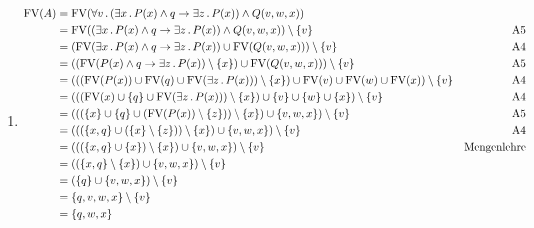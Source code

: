 


\newcommand{\FV}{\text{FV}}
\newcommand{\BV}{\text{BV}}


\date{Donnerstag 5.12.2019}

\newcommand\X{\mathcal{X}}



\maketitle
\thispagestyle{fancy}


\begin{enumerate}[1)]
	\item \begin{align*}
		\FV(A) & = \FV (\fall{v} (\ex{x} P(x) \land q \to \ex{z} P(x)) \land Q(v, w, x)) \\
		  & = \FV((\ex{x} P(x) \land q \to \ex{z} P(x)) \land Q(v, w, x)) \setminus \{v\} & \text{A5} \\
		  & = (\FV(\ex{x} P(x) \land q \to \ex{z} P(x)) \cup \FV ( Q(v, w, x)) ) \setminus \{v\}  & \text{A4} \\
		  & = ((\FV(P(x) \land q \to \ex{z} P(x)) \setminus \{x\}) \cup \FV ( Q(v, w, x)) ) \setminus \{v\} & \text{A5} \\
		  & = (((\FV(P(x)) \cup \FV(q) \cup \FV(\ex{z} P(x))) \setminus \{x\}) \cup \FV(v) \cup \FV(w) \cup \FV(x)) \setminus \{v\}  & \text{A4} \\
		  & = (((\FV(x) \cup \{q\} \cup \FV(\ex{z} P(x))) \setminus \{x\}) \cup \{v\} \cup \{w\} \cup \{x\}) \setminus \{v\} & \text{A4} \\
		  & = (((\{x\} \cup \{q\} \cup (\FV(P(x)) \setminus \{z\} )) \setminus \{x\}) \cup \{v,w,x\}) \setminus \{v\} & \text{A5} \\
		  & = (((\{x, q\} \cup (\{x\} \setminus \{z\})) \setminus \{x\}) \cup \{v,w,x\}) \setminus \{v\} & \text{A4} \\
		  & = (((\{x, q\} \cup \{x\}) \setminus \{x\}) \cup \{v,w,x\}) \setminus \{v\} & \text{Mengenlehre} \\
		  & = ((\{x, q\} \setminus \{x\}) \cup \{v,w,x\}) \setminus \{v\} \\
		  & = (\{q\} \cup \{v,w,x\}) \setminus \{v\} \\
		  & = \{q, v,w,x\} \setminus \{v\} \\
		  & = \{q,w,x\}\\ \\

\end{align*}
\end{enumerate}
